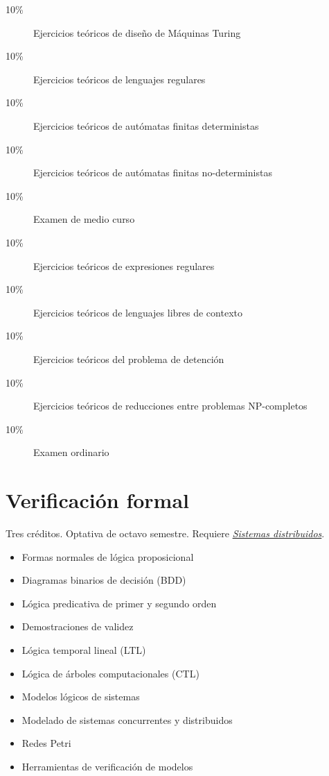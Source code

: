 \documentclass{article}
\begin{document}
\begin{multicols}{4}
\begin{description}
\item[10\%]{Ejercicios te\'{o}ricos de dise\~{n}o de M\'{a}quinas Turing}  
\item[10\%]{Ejercicios te\'{o}ricos de lenguajes regulares}
\item[10\%]{Ejercicios te\'{o}ricos de aut\'{o}matas finitas deterministas}
\item[10\%]{Ejercicios te\'{o}ricos de aut\'{o}matas finitas no-deterministas}
\item[10\%]{Examen de medio curso}
\item[10\%]{Ejercicios te\'{o}ricos de expresiones regulares}  
\item[10\%]{Ejercicios te\'{o}ricos de lenguajes libres de contexto}
\item[10\%]{Ejercicios te\'{o}ricos del problema de detenci\'{o}n}
\item[10\%]{Ejercicios te\'{o}ricos de reducciones entre problemas NP-completos}      
\item[10\%]{Examen ordinario}
\end{description}  

\vfill\null \columnbreak

\hypertarget{vf}{\section*{Verificaci\'{o}n formal}} 

Tres cr\'{e}ditos. Optativa de octavo semestre. Requiere
\hyperlink{sdi}{\em Sistemas distribuidos}.

\begin{itemize}
\item{Formas normales de l\'{o}gica proposicional}
\item{Diagramas binarios de decisi\'{o}n (BDD)}
\item{L\'{o}gica predicativa de primer y segundo orden}
\item{Demostraciones de validez}
\item{L\'{o}gica temporal lineal (LTL)}
\item{L\'{o}gica de \'{a}rboles computacionales (CTL)}
\item{Modelos l\'{o}gicos de sistemas}
\item{Modelado de sistemas concurrentes y distribuidos}
\item{Redes Petri}
\item{Herramientas de verificaci\'{o}n de modelos}
\end{itemize}


\end{multicols}
\end{document}

